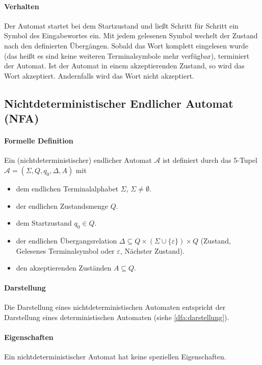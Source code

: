 		\paragraph{Verhalten}
			\label{dfa:verhalten}
			Der Automat startet bei dem Startzustand und ließt Schritt für Schritt ein Symbol des Eingabewortes ein. Mit jedem gelesenen Symbol wechelt der Zustand nach den definierten Übergängen. Sobald das Wort komplett eingelesen wurde (das heißt es sind keine weiteren Terminalsymbole mehr verfügbar), terminiert der Automat. Ist der Automat in einem akzeptierenden Zustand, so wird das Wort akzeptiert. Andernfalls wird das Wort nicht akzeptiert.


	\subsection{Nichtdeterministischer Endlicher Automat (NFA)}
		\paragraph{Formelle Definition}
			Ein (nichtdeterministischer) endlicher Automat $ \mathcal{A} $ ist definiert durch das 5-Tupel $ \mathcal{A} = (\Sigma, Q, q _ 0, \Delta, A) $ mit
			\begin{itemize}
				\item dem endlichen Terminalalphabet $ \Sigma $, $ \Sigma \neq \emptyset $.
				\item der endlichen Zustandsmenge $ Q $.
				\item dem Startzustand $ q _ 0 \in Q $.
				\item der endlichen Übergangsrelation $ \Delta \subseteq Q \times (\Sigma \cup \{ \varepsilon \}) \times Q $ (Zustand, Gelesenes Terminalsymbol oder $ \varepsilon $, Nächster Zustand).
				\item den akzeptierenden Zuständen $ A \subseteq Q $.
			\end{itemize}

		\paragraph{Darstellung}
			Die Darstellung eines nichtdeterministischen Automaten entspricht der Darstellung eines deterministischen Automaten (siehe \ref{dfa:darstellung}).

		\paragraph{Eigenschaften}
			Ein nichtdeterministischer Automat hat keine speziellen Eigenschaften.

